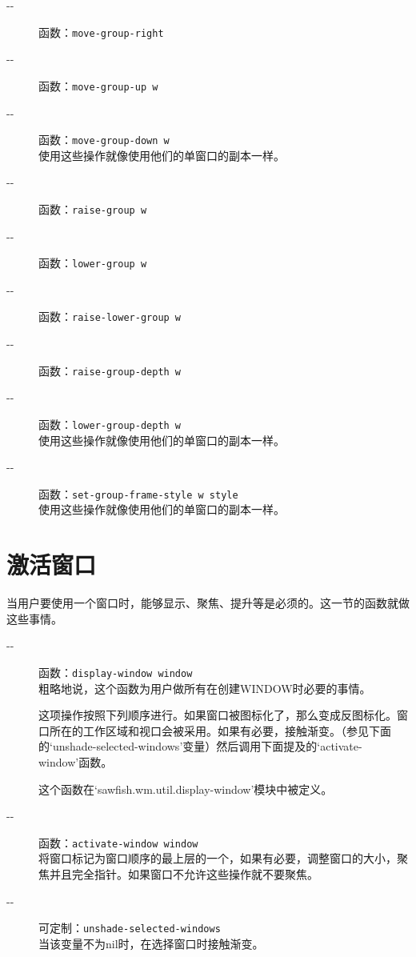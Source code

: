 \documentclass{book}
\begin{document}
\begin{CJK*}{UTF8}{gbsn}
\begin{description}
\item[-{}-] 函数：\verb|move-group-right|\\
\item[-{}-] 函数：\verb|move-group-up w|\\
\item[-{}-] 函数：\verb|move-group-down w|\\
使用这些操作就像使用他们的单窗口的副本一样。
\item[-{}-] 函数：\verb|raise-group w|\\
\item[-{}-] 函数：\verb|lower-group w|\\
\item[-{}-] 函数：\verb|raise-lower-group w|\\
\item[-{}-] 函数：\verb|raise-group-depth w|\\
\item[-{}-] 函数：\verb|lower-group-depth w|\\
使用这些操作就像使用他们的单窗口的副本一样。
\item[-{}-] 函数：\verb|set-group-frame-style w style|\\
使用这些操作就像使用他们的单窗口的副本一样。
\end{description}
\section{激活窗口}
当用户要使用一个窗口时，能够显示、聚焦、提升等是必须的。这一节的函数就做这些事情。
\begin{description}
\item[-{}-] 函数：\verb|display-window window|\\
粗略地说，这个函数为用户做所有在创建WINDOW时必要的事情。

这项操作按照下列顺序进行。如果窗口被图标化了，那么变成反图标化。窗口所在的工作区域和视口会被采用。如果有必要，接触渐变。（参见下面的`unshade-selected-windows'变量）然后调用下面提及的`activate-window'函数。

这个函数在`sawfish.wm.util.display-window'模块中被定义。
\item[-{}-] 函数：\verb|activate-window window|\\
将窗口标记为窗口顺序的最上层的一个，如果有必要，调整窗口的大小，聚焦并且完全指针。如果窗口不允许这些操作就不要聚焦。
\item[-{}-] 可定制：\verb|unshade-selected-windows|\\
当该变量不为nil时，在选择窗口时接触渐变。
\end{description}

\end{CJK*}
\end{document}
